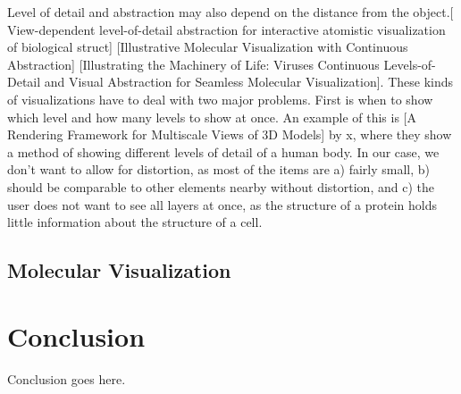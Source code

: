 \documentclass[review,journal]{vgtc}         %
\begin{document}
Level of detail and abstraction may also depend on the distance from the object.[ View-dependent level-of-detail abstraction for interactive atomistic visualization of biological struct] [Illustrative Molecular Visualization with Continuous Abstraction] [Illustrating the Machinery of Life: Viruses Continuous Levels-of-Detail and Visual Abstraction for Seamless Molecular Visualization]. 
These kinds of visualizations have to deal with two major problems. First is when to show which level and how many levels to show at once. An example of this is [A Rendering Framework for Multiscale Views of 3D Models] by x, where they show a method of showing different levels of detail of a human body. In our case, we don’t want to allow for distortion, as most of the items are a) fairly small, b) should be comparable to other elements nearby without distortion, and c) the user does not want to see all layers at once, as the structure of a protein holds little information about the structure of a cell.

\subsection{Molecular Visualization}

\section{Conclusion}

Conclusion goes here.




\end{document}
